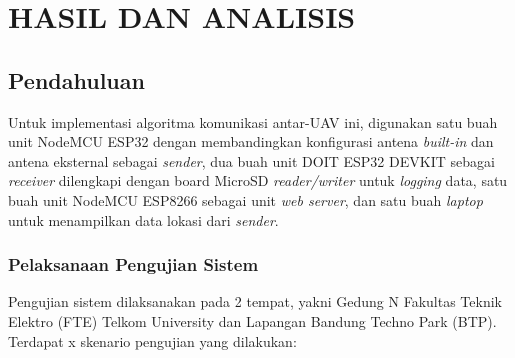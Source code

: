 \chapter{HASIL DAN ANALISIS}
\section{Pendahuluan}
Untuk implementasi algoritma komunikasi antar-UAV ini, digunakan satu buah unit NodeMCU ESP32 dengan membandingkan konfigurasi antena \textit{built-in} dan antena eksternal sebagai \textit{sender}, dua buah unit DOIT ESP32 DEVKIT sebagai \textit{receiver} dilengkapi dengan board MicroSD \textit{reader/writer} untuk \textit{logging} data, satu buah unit NodeMCU ESP8266 sebagai unit \textit{web server}, dan satu buah \textit{laptop} untuk menampilkan data lokasi dari \textit{sender}.
\subsection{Pelaksanaan Pengujian Sistem}
Pengujian sistem dilaksanakan pada 2 tempat, yakni Gedung N Fakultas Teknik Elektro (FTE) Telkom University dan Lapangan Bandung Techno Park (BTP). Terdapat x skenario pengujian yang dilakukan:
